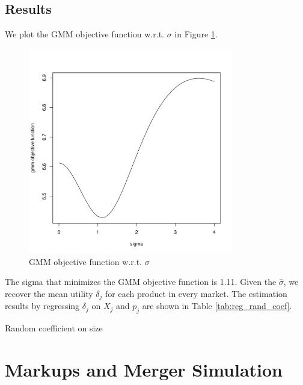 \documentclass[12pt]{article}[margin=1in]
\begin{document}
\subsection{Results}
We plot the GMM objective function w.r.t. $\sigma$ in Figure
\ref{fig:iv_local_diff}.

\begin{figure}[h!]
    \centering
    \includegraphics[width=0.8\textwidth]{../Results/Figures/gmm_obj_iv_instr.pdf}
    \caption{GMM objective function w.r.t. $\sigma$}
    \label{fig:iv_local_diff}
\end{figure}

The sigma that minimizes the GMM objective function is 1.11. Given the
$\hat{\sigma}$, we recover the mean utility $\delta_j$ for each product in
every market. The estimation results by regressing $\delta_j$ on $X_j$ and
$p_j$ are shown in Table \ref{tab:reg_rand_coef}.

\begin{table}[h!]
    \fontsize{10pt}{12pt}\selectfont
    \centering
    
    \caption{Random coefficient on size}
    \label{tab:reg_rand_coef}
\end{table}

\section{Markups and Merger Simulation}
\end{document}
